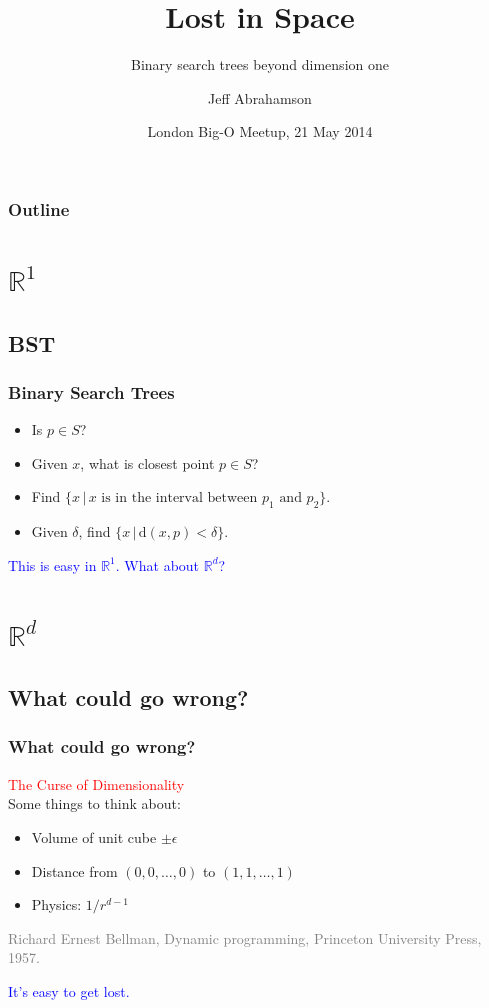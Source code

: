 \documentclass{beamer}
\title[Lost!] %
{Lost in Space}
\subtitle{Binary search trees beyond dimension one}
\author[Abrahamson]
{Jeff Abrahamson}
\institute[Google]{Google, Inc.}
\date[Big-O Meetup]
{London Big-O Meetup, 21 May 2014}
\begin{document}

\begin{frame}
  \titlepage
\end{frame}

\begin{frame}
  \frametitle{Outline}
  \tableofcontents[pausesections]
\end{frame}

\section{$\mathbb{R}^1$}
\subsection{BST}

\begin{frame}
  \frametitle{Binary Search Trees}
  \begin{itemize}
  \item Is $p\in S$?
  \item Given $x$, what is closest point $p\in S$?
  \item Find $\{x\,|\,x \textrm{ is in the interval between } p_1 \textrm{ and } p_2\}$.
  \item Given $\delta$, find $\{x\,|\,\mathrm{d}(x,p) < \delta\}$.
  \end{itemize}
  \pause
  \bigskip
  \textcolor{blue}{This is easy in $\mathbb{R}^1$.  What about $\mathbb{R}^d$?}
\end{frame}

\section{$\mathbb{R}^d$}
\subsection{What could go wrong?}

\begin{frame}
  \frametitle{What could go wrong?}
  \textcolor{red}{The Curse of Dimensionality}\\
  \bigskip
  \pause
  Some things to think about:
  \begin{itemize}
  \item Volume of unit cube $\pm\epsilon$
  \item Distance from $(0,0,\ldots,0)$ to $(1,1,\ldots,1)$
  \item Physics: $1/r^{d-1}$
  \end{itemize}
  \pause
  \bigskip
  \textcolor{gray}{Richard Ernest Bellman, Dynamic
    programming, Princeton University Press, 1957.}
  
  \pause
  \medskip
  \textcolor{blue}{It's easy to get lost.}
\end{frame}
\end{document}
